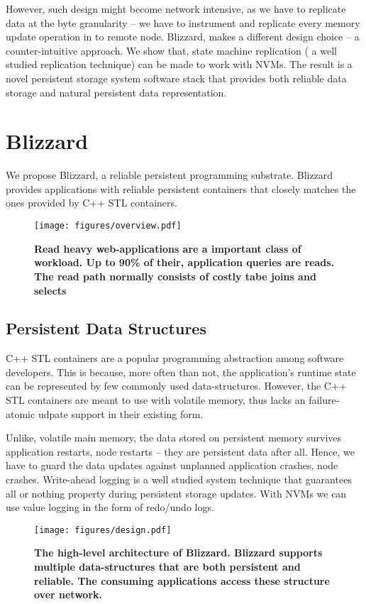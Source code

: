 However, such design might become network intensive, as we have to replicate data at the byte
granularity -- we have to instrument and replicate every memory update operation in to remote node.
Blizzard, makes a different design choice -- a counter-intuitive approach. We show that, state 
machine replication ( a well studied replication technique) can be made to work with NVMs. 
The result is a novel persistent storage system software stack that provides both reliable data
storage and natural persistent data representation.

\section{Blizzard}
We propose Blizzard, a reliable persistent programming substrate. Blizzard provides applications
with reliable persistent containers that closely matches the ones provided by C++ STL containers.

\begin{figure}[tbp]   
	\centering
	\texttt{[image: figures/overview.pdf]} 
	\caption{\bf Read heavy web-applications are a important class of workload. Up to 90\% of their,
	application queries are reads. The read path normally consists of costly tabe joins and selects} 
	\label{fig:analytics} 
\end{figure}


\subsection{Persistent Data Structures}

C++ STL containers are a popular programming abstraction among software developers. This is because,
more often than not, the application's runtime state can be represented by few commonly used 
data-structures.  However, the C++ STL containers are meant to use with volatile memory, thus
lacks an failure-atomic udpate support in their existing form.

Unlike, volatile main memory, the data stored on persistent memory survives application restarts,
node restarts -- they are persistent data after all. Hence, we have to guard the data updates 
against unplanned application crashes, node crashes. Write-ahead logging is a well studied
system technique that guarantees all or nothing property during persistent storage updates.
With NVMs we can use value logging in the form of redo/undo logs.

\begin{figure}[tbp]   
	\centering
	\texttt{[image: figures/design.pdf]} 
	\caption{\bf The high-level architecture of Blizzard. Blizzard supports multiple data-structures that are both
	persistent and reliable. The consuming applications access these structure over network.} 
	\label{fig:arch} 
\end{figure}

